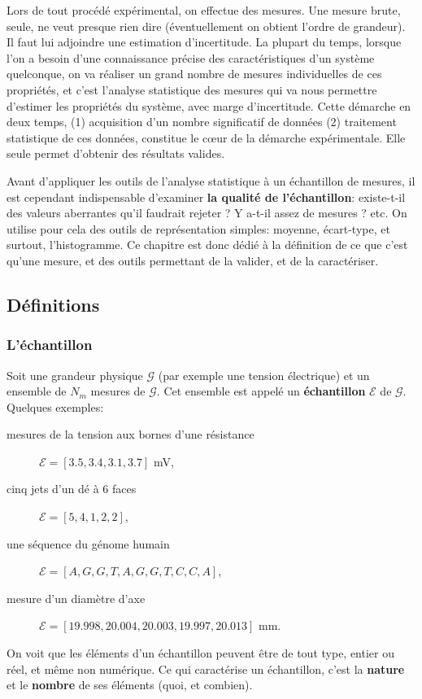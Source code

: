 \documentclass[main.tex]{subfiles}
\begin{document}
Lors de tout procédé expérimental, on effectue des mesures. Une mesure brute, seule, ne veut presque rien dire (éventuellement on obtient l'ordre de grandeur). Il faut lui adjoindre une estimation d'incertitude. La plupart du temps, lorsque l'on a besoin d'une connaissance précise des caractéristiques d'un système quelconque, on va réaliser un grand nombre de mesures individuelles de ces propriétés, et c'est l'analyse statistique des mesures qui va nous permettre d'estimer les propriétés du système, avec marge d'incertitude. Cette démarche en deux temps, (1) acquisition d'un nombre significatif de données (2) traitement statistique de ces données, constitue le c\oe ur de la démarche expérimentale. Elle seule permet d'obtenir des résultats valides.

Avant d'appliquer les outils de l'analyse statistique à un échantillon de mesures, il est cependant indispensable d'examiner \textbf{la qualité de l'échantillon}: existe-t-il des valeurs aberrantes qu'il faudrait rejeter ? Y a-t-il assez de mesures ? etc. On utilise pour cela des outils de représentation simples: moyenne, écart-type, et surtout, l'histogramme. Ce chapitre est donc dédié à la définition de ce que c'est qu'une mesure, et des outils permettant de la valider, et de la caractériser.

\subsection{Définitions}

\subsubsection{L'échantillon}

Soit une grandeur physique $\mathcal{G}$ (par exemple une tension électrique) et un ensemble de $N_m$ mesures de $\mathcal{G}$. Cet ensemble est appelé un \textbf{échantillon} $\mathcal{E}$ de $\mathcal{G}$. Quelques exemples:
\begin{description}
    \item[mesures de la tension aux bornes d'une résistance] $\mathcal{E}=[3.5,3.4,3.1,3.7]$ mV,
    \item[cinq jets d'un dé à 6 faces] $\mathcal{E}=[5,4,1,2,2]$,
    \item[une séquence du génome humain] $\mathcal{E}=[A,G,G,T,A,G,G,T,C,C,A]$,
    \item[mesure d'un diamètre d'axe] $\mathcal{E}=[19.998,20.004,20.003,19.997,20.013]$ mm.
\end{description}
On voit que les éléments d'un échantillon peuvent être de tout type, entier ou réel, et même non numérique. Ce qui caractérise un échantillon, c'est la \textbf{nature} et le \textbf{nombre} de ses éléments (quoi, et combien).
\end{document}
